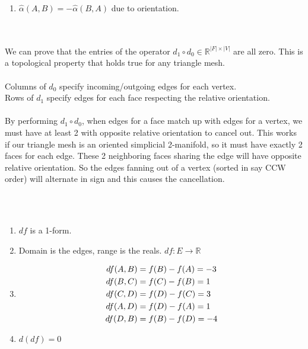 \documentclass{article}
\begin{document}
\begin{enumerate}[label=(\alph*)]
    \item
    $\hat{\alpha}(A, B) = -\hat{\alpha}(B, A)$ due to orientation.
\end{enumerate}


\pagebreak
{}\\\\

We can prove that the entries of the operator $d_1 \circ d_0 \in \mathbb{R}^{|F| \times |V|}$ are all zero. This
is a topological property that holds true for any triangle mesh.\\\\
Columns of $d_0$ specify incoming/outgoing edges for each vertex.\\
Rows of $d_1$ specify edges for each face respecting the relative orientation.\\\\
By performing $d_1 \circ d_0$, when edges for a face match up with edges for a vertex, we must
have at least 2 with opposite relative orientation to cancel out. This works if our triangle mesh is an oriented simplicial 2-manifold,
so it must have exactly 2 faces for each edge. These 2 neighboring faces sharing the edge will have opposite relative orientation.
So the edges fanning out of a vertex (sorted in say CCW order) will alternate in sign and this causes the cancellation.


\vspace{1.8cm}
\\\\

\begin{enumerate}[label=(\alph*)]
    \item $df$ is a 1-form.
    \item Domain is the edges, range is the reals. $df : E \rightarrow \mathbb{R}$
    \item 
    \begin{align}
        df(A, B) &= f(B) - f(A) = -3 \notag\\
        df(B, C) &= f(C) - f(B) = 1 \notag\\
        df(C, D) &= f(D) - f(C) = 3 \notag\\
        df(A, D) &= f(D) - f(A) = 1 \notag\\
        df(D, B) &= f(B) - f(D) = -4 \notag
    \end{align}
    \item $d(df) = 0$
\end{enumerate}
\end{document}
